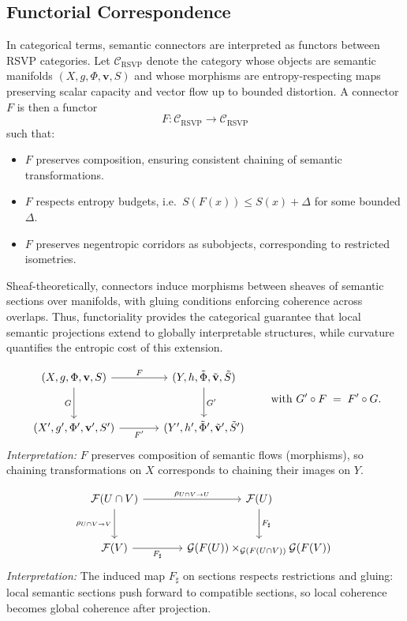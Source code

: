 \documentclass{article}
\theoremstyle{definition}
\begin{document}
\subsection{Functorial Correspondence}

In categorical terms, semantic connectors are interpreted as functors between
RSVP categories. Let $\mathcal{C}_{\text{RSVP}}$ denote the category whose
objects are semantic manifolds $(X,g,\Phi,\mathbf{v},S)$ and whose morphisms
are entropy-respecting maps preserving scalar capacity and vector flow up to
bounded distortion. A connector $F$ is then a functor
\[
F : \mathcal{C}_{\text{RSVP}} \to \mathcal{C}_{\text{RSVP}}
\]
such that:
\begin{itemize}
  \item $F$ preserves composition, ensuring consistent chaining of semantic
        transformations.
  \item $F$ respects entropy budgets, i.e.\ $S(F(x)) \leq S(x) + \Delta$ for
        some bounded $\Delta$.
  \item $F$ preserves negentropic corridors as subobjects, corresponding to
        restricted isometries.
\end{itemize}

Sheaf-theoretically, connectors induce morphisms between sheaves of semantic
sections over manifolds, with gluing conditions enforcing coherence across
overlaps. Thus, functoriality provides the categorical guarantee that local
semantic projections extend to globally interpretable structures, while
curvature quantifies the entropic cost of this extension.

\[
\begin{tikzcd}[column sep=large,row sep=large]
(X,g,\Phi,\mathbf{v},S)
  \arrow[r, "F"]
  \arrow[d,swap,"G"]
&
(Y,h,\tilde{\Phi},\tilde{\mathbf{v}},\tilde{S})
  \arrow[d,"G'"]
\\
(X',g',\Phi',\mathbf{v}',S')
  \arrow[r,swap,"F'"]
&
(Y',h',\tilde{\Phi}',\tilde{\mathbf{v}}',\tilde{S}')
\end{tikzcd}
\qquad
\text{with } G' \circ F \;=\; F' \circ G.
\]
\noindent
\textit{Interpretation:} $F$ preserves composition of semantic flows (morphisms),
so chaining transformations on $X$ corresponds to chaining their images on $Y$.

\[
\begin{tikzcd}[column sep=large,row sep=large]
\mathcal{F}(U\cap V)
  \arrow[r,"\rho_{U\cap V\to U}"]
  \arrow[d,swap,"\rho_{U\cap V\to V}"]
&
\mathcal{F}(U)
  \arrow[d,"F_\sharp"]
\\
\mathcal{F}(V)
  \arrow[r,swap,"F_\sharp"]
&
\mathcal{G}(F(U)) \times_{\mathcal{G}(F(U\cap V))} \mathcal{G}(F(V))
\end{tikzcd}
\]
\noindent
\textit{Interpretation:} The induced map $F_\sharp$ on sections respects
restrictions and gluing: local semantic sections push forward to compatible
sections, so local coherence becomes global coherence after projection.
\end{document}
